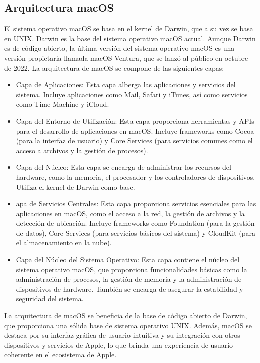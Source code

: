 \documentclass[11pt,twoside]{book}
\begin{document}
\subsection{Arquitectura macOS}
El sistema operativo macOS se basa en el kernel de Darwin, que a su vez se basa en UNIX. Darwin es la base del sistema operativo macOS actual. Aunque Darwin es de código abierto, la última versión del sistema operativo macOS es una versión propietaria llamada macOS Ventura, que se lanzó al público en octubre de 2022.
La arquitectura de macOS se compone de las siguientes capas:
\begin{itemize}
  \item Capa de Aplicaciones: Esta capa alberga las aplicaciones y servicios del sistema. Incluye aplicaciones como Mail, Safari y iTunes, así como servicios como Time Machine y iCloud.

  \item Capa del Entorno de Utilización: Esta capa proporciona herramientas y APIs para el desarrollo de aplicaciones en macOS. Incluye frameworks como Cocoa (para la interfaz de usuario) y Core Services (para servicios comunes como el acceso a archivos y la gestión de procesos).

  \item Capa del Núcleo: Esta capa se encarga de administrar los recursos del hardware, como la memoria, el procesador y los controladores de dispositivos. Utiliza el kernel de Darwin como base.


  \item apa de Servicios Centrales: Esta capa proporciona servicios esenciales para las aplicaciones en macOS, como el acceso a la red, la gestión de archivos y la detección de ubicación. Incluye frameworks como Foundation (para la gestión de datos), Core Services (para servicios básicos del sistema) y CloudKit (para el almacenamiento en la nube).

  \item Capa del Núcleo del Sistema Operativo: Esta capa contiene el núcleo del sistema operativo macOS, que proporciona funcionalidades básicas como la administración de procesos, la gestión de memoria y la administración de dispositivos de hardware. También se encarga de asegurar la estabilidad y seguridad del sistema.
\end{itemize}
La arquitectura de macOS se beneficia de la base de código abierto de Darwin, que proporciona una sólida base de sistema operativo UNIX. Además, macOS se destaca por su interfaz gráfica de usuario intuitiva y su integración con otros dispositivos y servicios de Apple, lo que brinda una experiencia de usuario coherente en el ecosistema de Apple.
\vspace{5pt}
\end{document}
